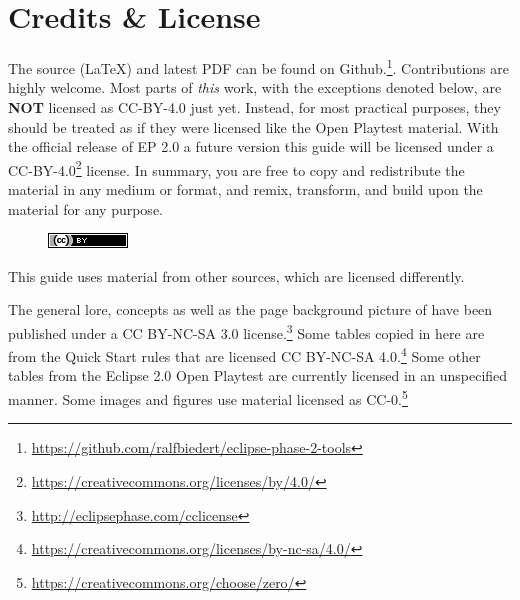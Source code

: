 \section*{Credits \& License}


\begin{itemize}
    \itembox The source (LaTeX) and latest PDF can be found on Github.\footnote{\url{https://github.com/ralfbiedert/eclipse-phase-2-tools}}. Contributions are highly welcome.
    \itembox Most parts of \textit{this} work, with the exceptions denoted below, are \textbf{NOT} licensed as CC-BY-4.0 just yet. Instead, for most practical purposes, they should be treated as if they were licensed like the Open Playtest material.
    \itembox With the official release of EP 2.0 a future version this guide will be licensed under a  CC-BY-4.0\footnote{\url{https://creativecommons.org/licenses/by/4.0/}} license. In summary, you are free to copy and redistribute the material in any medium or format, and remix, transform, and build upon the material
    for any purpose.

     \begin{figure}[H]
         \centering
         \includegraphics{gfx/license}\\
     \end{figure}
\end{itemize}

This guide uses material from other sources, which are licensed differently.

\begin{itemize}
    \itembox The general lore, concepts as well as the page background picture of \eclipsephase have been published under a CC BY-NC-SA 3.0 license.\footnote{\url{http://eclipsephase.com/cclicense}}
    \itembox Some tables copied in here are from the  Quick Start rules that are licensed CC BY-NC-SA 4.0.\footnote{\url{https://creativecommons.org/licenses/by-nc-sa/4.0/}} Some other tables from the Eclipse 2.0 Open Playtest are currently licensed in an unspecified manner.
    \itembox Some images and figures use material licensed as CC-0.\footnote{\url{https://creativecommons.org/choose/zero/}}
\end{itemize}

